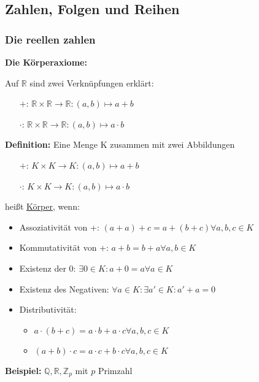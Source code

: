 \documentclass[pdftex,12pt,a4paper,fleqn]{scrartcl}
\begin{document}
\subsection{Zahlen, Folgen und Reihen} %
\label{sub:zahlen_folgen_und_reihen}

\subsubsection{Die reellen zahlen} %
\label{ssub:die_reellen_zahlen}

\textbf{Die Körperaxiome:}

Auf $\mathbb{R}$ sind zwei Verknüpfungen erklärt:
\begin{itemize}
	\item[$+$:] $\mathbb{R} \times \mathbb{R} \rightarrow \mathbb{R} : (a,b) \mapsto a + b$
	\item[$\cdot$:] $\mathbb{R} \times \mathbb{R} \rightarrow \mathbb{R} : (a,b) \mapsto a \cdot b$
\end{itemize}

\textbf{Definition:} Eine Menge K zusammen mit zwei Abbildungen
\begin{itemize}
	\item[$+$:] $K\times K\rightarrow K : (a,b) \mapsto a + b$
	\item[$\cdot$:] $K \times K \rightarrow K : (a,b) \mapsto a \cdot b$
\end{itemize}
heißt \underline{Körper}, wenn:

\begin{itemize}
	\item Assoziativität von +: $(a+a) + c = a + (b+c) \forall a,b,c \in K$
	\item Kommutativität von +: $a+b = b+a \forall a,b \in K$
	\item Existenz der 0: $\exists 0 \in K: a+0 = a \forall a \in K$
	\item Existenz des Negativen: $\forall a \in K: \exists a' \in K: a' + a = 0$
	\item Distributivität:
	\begin{itemize}
		\item $a \cdot (b + c) = a \cdot b + a \cdot c \forall a,b,c \in K$
		\item $(a + b) \cdot c = a \cdot c + b \cdot c \forall a,b,c \in K$
	\end{itemize}
\end{itemize}

\textbf{Beispiel:}
$\mathbb{Q},\mathbb{R},\mathbb{Z}_p$ mit $p$ Primzahl




\end{document}

